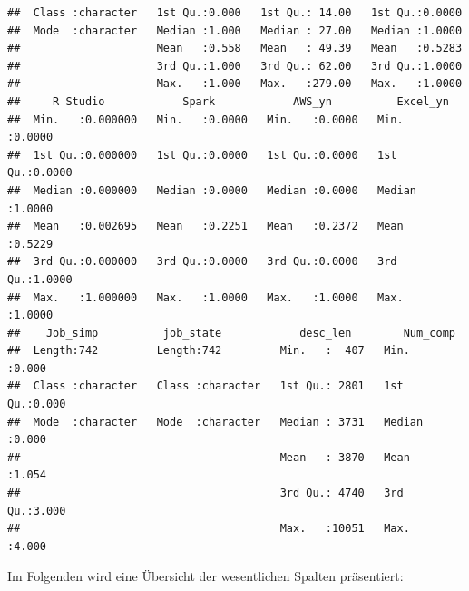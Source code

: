 \documentclass[
]{article}
\begin{document}
\begin{verbatim}
##  Class :character   1st Qu.:0.000   1st Qu.: 14.00   1st Qu.:0.0000  
##  Mode  :character   Median :1.000   Median : 27.00   Median :1.0000  
##                     Mean   :0.558   Mean   : 49.39   Mean   :0.5283  
##                     3rd Qu.:1.000   3rd Qu.: 62.00   3rd Qu.:1.0000  
##                     Max.   :1.000   Max.   :279.00   Max.   :1.0000  
##     R Studio            Spark            AWS_yn          Excel_yn     
##  Min.   :0.000000   Min.   :0.0000   Min.   :0.0000   Min.   :0.0000  
##  1st Qu.:0.000000   1st Qu.:0.0000   1st Qu.:0.0000   1st Qu.:0.0000  
##  Median :0.000000   Median :0.0000   Median :0.0000   Median :1.0000  
##  Mean   :0.002695   Mean   :0.2251   Mean   :0.2372   Mean   :0.5229  
##  3rd Qu.:0.000000   3rd Qu.:0.0000   3rd Qu.:0.0000   3rd Qu.:1.0000  
##  Max.   :1.000000   Max.   :1.0000   Max.   :1.0000   Max.   :1.0000  
##    Job_simp          job_state            desc_len        Num_comp    
##  Length:742         Length:742         Min.   :  407   Min.   :0.000  
##  Class :character   Class :character   1st Qu.: 2801   1st Qu.:0.000  
##  Mode  :character   Mode  :character   Median : 3731   Median :0.000  
##                                        Mean   : 3870   Mean   :1.054  
##                                        3rd Qu.: 4740   3rd Qu.:3.000  
##                                        Max.   :10051   Max.   :4.000
\end{verbatim}

Im Folgenden wird eine Übersicht der wesentlichen Spalten präsentiert:
\end{document}
